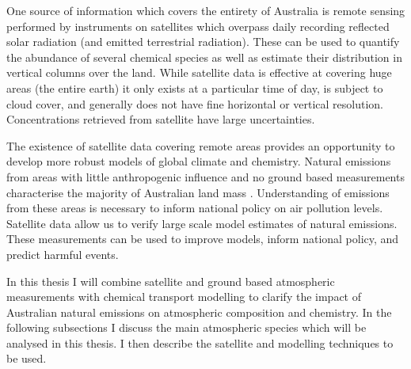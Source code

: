 One source of information which covers the entirety of Australia is remote sensing performed by instruments on satellites which overpass daily recording reflected solar radiation (and emitted terrestrial radiation).
These can be used to quantify the abundance of several chemical species as well as estimate their distribution in vertical columns over the land.
While satellite data is effective at covering huge areas (the entire earth) it only exists at a particular time of day, is subject to cloud cover, and generally does not have fine horizontal or vertical resolution.
Concentrations retrieved from satellite have large uncertainties.

The existence of satellite data covering remote areas provides an opportunity to develop more robust models of global climate and chemistry.
Natural emissions from areas with little anthropogenic influence and no ground based measurements characterise the majority of Australian land mass \cite{VanDerA_2008}.
Understanding of emissions from these areas is necessary to inform national policy on air pollution levels.
Satellite data allow us to verify large scale model estimates of natural emissions.
These measurements can be used to improve models, inform national policy, and predict harmful events.

In this thesis I will combine satellite and ground based atmospheric measurements with chemical transport modelling to clarify the impact of Australian natural emissions on atmospheric composition and chemistry.
In the following subsections I discuss the main atmospheric species which will be analysed in this thesis.
I then describe the satellite and modelling techniques to be used.
